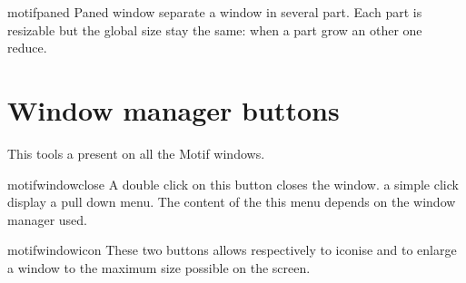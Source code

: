 \begin{PAWf}[.2]{motifpaned}
Paned window separate a window in several part. Each part is resizable
but the global size stay the same: when a part grow an other one
reduce.
\end{PAWf}


\section{Window manager buttons}
This tools a present on all the Motif windows.

\begin{PAWf}[.2]{motifwindowclose}
A double click on this button closes the window.
a simple click display a pull down menu. The content
of the this menu depends on the window manager used.
\end{PAWf}

\begin{PAWf}[.2]{motifwindowicon}
These two buttons allows respectively to iconise and to enlarge
a window to the maximum size possible on the screen.
\end{PAWf}


\endinput